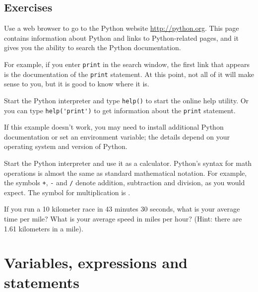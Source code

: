 \documentclass[10pt]{book}
\begin{document}
\section{Exercises}

\begin{exercise}

Use a web browser to go to the Python website \url{http://python.org}.
This page contains information about Python and links
to Python-related pages, and it gives you the ability to search
the Python documentation.

For example, if you enter {\tt print} in the search window, the
first link that appears is the documentation of the {\tt print}
statement.  At this point, not all of it will make sense to you,
but it is good to know where it is.

\end{exercise}

\begin{exercise}

Start the Python interpreter and type {\tt help()} to start the online
help utility.  Or you can type \verb"help('print')" to get information
about the {\tt print} statement.

If this example doesn't work, you
may need to install additional Python documentation or set an
environment variable; the details depend on your operating system and
version of Python.

\end{exercise}

\begin{exercise}

Start the Python interpreter and use it as a calculator.
Python's syntax for math operations is almost the same as
standard mathematical notation.  For example, the symbols
{\tt +}, {\tt -} and {\tt /} denote addition, subtraction
and division, as you would expect.  The symbol for
multiplication is {\tt *}.

If you run a 10 kilometer race in 43 minutes 30 seconds, what is your
average time per mile?  What is your average speed in miles per hour?
(Hint: there are 1.61 kilometers in a mile).

\end{exercise}




\chapter{Variables, expressions and statements}
\end{document}
